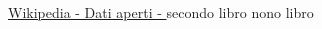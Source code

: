 \begin{thebibliography}{100}
  \href{https://it.wikipedia.org/wiki/Dati_aperti}{Wikipedia - Dati aperti - }
 secondo libro
 nono libro
\end{thebibliography} 